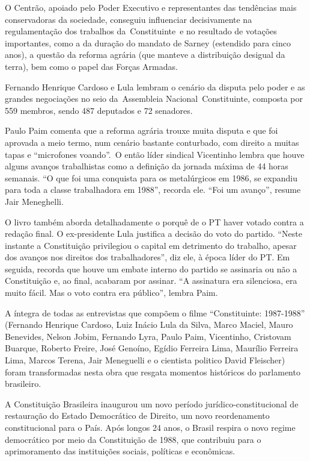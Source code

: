 O Centrão, apoiado pelo Poder Executivo e representantes das tendências
mais conservadoras da sociedade, conseguiu influenciar decisivamente na
regulamentação dos trabalhos da~Constituinte~e no resultado de votações
importantes, como a da duração do mandato de Sarney (estendido para
cinco anos), a questão da reforma agrária (que manteve a distribuição
desigual da terra), bem como o papel das Forças Armadas.

Fernando Henrique Cardoso e Lula lembram o cenário da disputa pelo poder
e as grandes negociações no seio da~Assembleia Nacional~Constituinte,
composta por 559 membros, sendo 487 deputados e 72 senadores.

Paulo Paim comenta que a reforma agrária trouxe muita disputa e que foi
aprovada a meio termo, num cenário bastante conturbado, com direito a
muitas tapas e ``microfones voando''.~O então líder sindical Vicentinho
lembra que houve alguns avanços trabalhistas como a definição da jornada
máxima de 44 horas semanais. ``O que foi uma conquista para os
metalúrgicos em 1986, se expandiu para toda a classe trabalhadora em
1988'', recorda ele. ``Foi um avanço'', resume Jair Meneghelli.

O livro também aborda detalhadamente o porquê de o PT haver votado
contra a redação final. O ex-presidente Lula justifica a decisão do voto
do partido. ``Neste instante a Constituição privilegiou o capital em
detrimento do trabalho, apesar dos avanços nos direitos dos
trabalhadores'', diz ele, à época líder do PT. Em seguida, recorda que
houve um embate interno do partido se assinaria ou não a Constituição e,
ao final, acabaram por assinar. ``A assinatura era silenciosa, era muito
fácil. Mas o voto contra era público'', lembra Paim.

A íntegra de todas as entrevistas que compõem o filme ``Constituinte:
1987-1988'' (Fernando Henrique Cardoso, Luiz Inácio Lula da Silva, Marco
Maciel, Mauro Benevides, Nelson Jobim, Fernando Lyra, Paulo Paim,
Vicentinho, Cristovam Buarque, Roberto Freire, José Genoíno, Egídio
Ferreira Lima, Maurílio Ferreira Lima, Marcos Terena, Jair Meneguelli e
o cientista politico David Fleischer) foram transformadas nesta obra que
resgata momentos históricos do parlamento brasileiro.

A Constituição Brasileira inaugurou um novo período
jurídico-constitucional de restauração do Estado Democrático de Direito,
um novo reordenamento constitucional para o País. Após longos 24 anos, o
Brasil respira o novo regime democrático por meio da Constituição de
1988, que contribuiu para o aprimoramento das instituições sociais,
políticas e econômicas.

